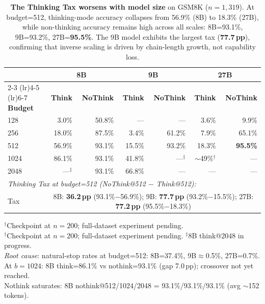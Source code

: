 \begin{table}[t]
\centering
\caption{\textbf{The Thinking Tax worsens with model size} on GSM8K ($n{=}1{,}319$).
At budget=512, thinking-mode accuracy collapses from 56.9\% (8B) to 18.3\% (27B),
while non-thinking accuracy remains high across all scales:
8B=93.1\%, 9B=93.2\%, 27B=\textbf{95.5\%}.
The 9B model exhibits the largest tax (\textbf{77.7\,pp}), confirming that
inverse scaling is driven by chain-length growth, not capability loss.}
\label{tab:model-size-scaling}
\small
\begin{tabular}{l rr rr rr}
\toprule
 & \multicolumn{2}{c}{\textbf{8B}} & \multicolumn{2}{c}{\textbf{9B}} & \multicolumn{2}{c}{\textbf{27B}} \\
\cmidrule(lr){2-3} \cmidrule(lr){4-5} \cmidrule(lr){6-7}
\textbf{Budget} & \textbf{Think} & \textbf{NoThink} & \textbf{Think} & \textbf{NoThink} & \textbf{Think} & \textbf{NoThink} \\
\midrule
128 & 3.0\%  & 50.8\% & ---    & ---    & 3.6\%  & 9.9\% \\
256 & 18.0\% & 87.5\% & 3.4\%  & 61.2\% & 7.9\%  & 65.1\% \\
512 & 56.9\% & 93.1\% & 15.5\% & 93.2\% & 18.3\% & \textbf{95.5\%} \\
1024 & 86.1\% & 93.1\% & 41.8\% & ---$^\ddagger$ & ${\sim}$49\%$^\dagger$ & --- \\
2048 & ---$^\ddagger$ & 93.1\% & 66.8\% & ---    & ---    & --- \\
\midrule
\multicolumn{7}{l}{\textit{Thinking Tax at budget=512 (NoThink@512 $-$ Think@512):}} \\
\midrule
Tax & \multicolumn{6}{c}{8B: \textbf{36.2\,pp} (93.1\%$-$56.9\%); \quad 9B: \textbf{77.7\,pp} (93.2\%$-$15.5\%); \quad 27B: \textbf{77.2\,pp} (95.5\%$-$18.3\%)} \\
\bottomrule
\end{tabular}
\vspace{1mm}

\footnotesize
$^\dagger$Checkpoint at $n{=}200$; full-dataset experiment pending.\\
$^\dagger$Checkpoint at $n{=}200$; full-dataset experiment pending.
$^\ddagger$8B think@2048 in progress.\\
\textit{Root cause}: natural-stop rates at budget=512: 8B=37.4\%, 9B${\approx}$0.5\%, 27B=0.7\%.\\
At $b{=}1024$: 8B think=86.1\% vs nothink=93.1\% (gap 7.0\,pp); crossover not yet reached.\\
Nothink saturates: 8B nothink@512/1024/2048 = 93.1\%/93.1\%/93.1\% (avg ${\sim}$152 tokens).\\
\vspace{-3mm}
\end{table}
